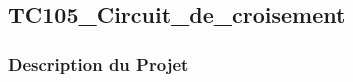 \documentclass[a4paper,12pt]{report}
\begin{document}
\newpage
\subsection{TC105\_Circuit\_de\_croisement}
\begin{center}
\label{}
\end{center}
\subsubsection{Description du Projet}
\end{document}
